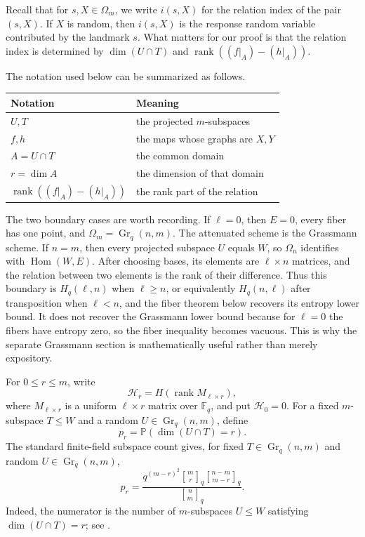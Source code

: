 \documentclass[11pt]{article}
\theoremstyle{definition}
\theoremstyle{remark}
\newcommand{\F}{\mathbb F}
\newcommand{\Gr}{\operatorname{Gr}}
\newcommand{\Hom}{\operatorname{Hom}}
\newcommand{\rank}{\operatorname{rank}}
\newcommand{\Prob}{\mathbb P}
\newcommand{\qbinom}[2]{\genfrac{[}{]}{0pt}{}{#1}{#2}_q}
\begin{document}
Recall that for \(s,X\in\Omega_m\), we write \(i(s, X)\) for the relation 
index of the pair \((s,X)\). If \(X\) is random, then \(i(s,X)\) is the 
response random variable contributed by the landmark \(s\). What matters 
for our proof is that the relation index is determined by \(\dim(U \cap 
T)\) and \(\rank((f|_A)-(h|_A))\).

The notation used below can be summarized as follows.
\begin{center}
\begin{tabular}{ll}
\toprule
Notation & Meaning \\
\midrule
$U,T$ & the projected $m$-subspaces \\
$f,h$ & the maps whose graphs are $X,Y$ \\
$A=U\cap T$ & the common domain \\
$r=\dim A$ & the dimension of that domain \\
$\rank((f|_A)-(h|_A))$ & the rank part of the relation \\
\bottomrule
\end{tabular}
\end{center}

The two boundary cases are worth recording.  If \(\ell=0\), then \(E=0\), 
every fiber has one point, and \(\Omega_m=\Gr_q(n,m)\).  The attenuated 
scheme is the Grassmann scheme.  If \(n=m\), then every projected subspace 
\(U\) equals \(W\), so \(\Omega_n\) identifies with \(\Hom(W,E)\).  After
choosing bases, its elements are \(\ell\times n\) matrices, and the relation
between two elements is the rank of their difference.  Thus this boundary
is \(H_q(\ell,n)\) when \(\ell\geq n\), or equivalently \(H_q(n,\ell)\)
after transposition when \(\ell<n\), and the fiber theorem below recovers
its entropy lower bound.  It does not
recover the Grassmann lower bound because for 
\(\ell=0\) the fibers have entropy zero, so the fiber inequality becomes 
vacuous.  This is why the separate Grassmann section is mathematically 
useful rather than merely expository.

For \(0\leq r\leq m\), write
\[
        \mathcal H_r=H(\rank M_{\ell\times r}),
\]
where \(M_{\ell\times r}\) is a uniform \(\ell\times r\) matrix over 
\(\F_q\), and put \(\mathcal H_0=0\).  For a fixed \(m\)-subspace \(T\leq 
W\) and a random \(U\in\Gr_q(n,m)\), define
\[
        p_r=\Prob(\dim(U\cap T)=r).
\]
The standard finite-field subspace count gives, for fixed 
\(T\in\Gr_q(n,m)\) and random \(U\in\Gr_q(n,m)\),
\[
        p_r=
        \frac{q^{(m-r)^2}\qbinom mr\qbinom{n-m}{m-r}}{\qbinom nm}.
\]
Indeed, the numerator is the number of \(m\)-subspaces \(U\leq W\) 
satisfying \(\dim(U\cap T)=r\); see \cite[Corollary~A.2]{Kurihara}.
\end{document}
